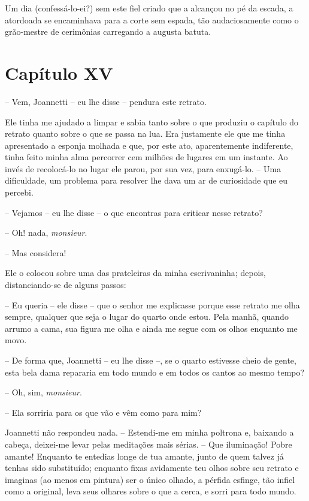 Um dia (confessá-lo-ei?) sem este fiel criado que a alcançou no pé da
escada, a atordoada se encaminhava para a corte sem espada, tão
audaciosamente como o grão-mestre de cerimônias carregando a augusta
batuta.

\section{Capítulo XV}

 -- Vem, Joannetti -- eu lhe disse -- pendura este retrato.

 Ele tinha me ajudado a limpar e sabia tanto sobre o que produziu o
capítulo do retrato quanto sobre o que se passa na lua. Era justamente
ele que me tinha apresentado a esponja molhada e que, por este ato,
aparentemente indiferente, tinha feito minha alma percorrer cem milhões
de lugares em um instante. Ao invés de recolocá-lo no lugar ele parou,
por sua vez, para enxugá-lo. -- Uma dificuldade, um problema para
resolver lhe dava um ar de curiosidade que eu percebi. 

 -- Vejamos -- eu lhe disse -- o que encontras para criticar nesse
retrato?

 -- Oh! nada, \textit{monsieur}. 

-- Mas considera!

Ele o colocou sobre uma das prateleiras da minha escrivaninha; depois,
distanciando-se de alguns passos:

-- Eu queria -- ele disse -- que o senhor me explicasse porque esse
retrato me olha sempre, qualquer que seja o lugar do quarto onde estou.
Pela manhã, quando arrumo a cama, sua figura me olha e ainda me segue
com os olhos enquanto me movo.

-- De forma que, Joannetti -- eu lhe disse --, se o quarto estivesse
cheio de gente, esta bela dama repararia em todo mundo e em todos os
cantos ao mesmo tempo? 

-- Oh, sim, \textit{monsieur}.

-- Ela sorriria para os que vão e vêm como para mim?

Joannetti não respondeu nada. -- Estendi-me em minha poltrona e,
baixando a cabeça, deixei-me levar pelas meditações mais sérias. --
Que iluminação! Pobre amante! Enquanto te entedias longe de tua amante,
junto de quem talvez já tenhas sido substituído; enquanto fixas
avidamente teu olhos sobre seu retrato e imaginas (ao menos em pintura)
ser o único olhado, a pérfida esfinge, tão infiel como a original, leva
seus olhares sobre o que a cerca, e sorri para todo mundo. 

